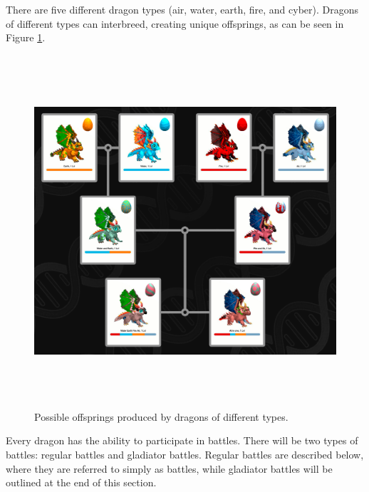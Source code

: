 \documentclass[12pt]{article}
\begin{document}
There are five different dragon types (air, water, earth, fire, and cyber). Dragons of different types can interbreed, creating unique offsprings, as can be seen in Figure \ref{fig:Possible_offsprings_produced_by_dragons_of_different_types_interbreeding}.\par



\begin{Center}
\begin{figure}[!ht]
	\begin{Center}		\includegraphics[width=6.27in,height=5.15in]{./media/image16.png}
		\caption{Possible offsprings produced by dragons of different types.}
		\label{fig:Possible_offsprings_produced_by_dragons_of_different_types_interbreeding}
	\end{Center}\end{figure}
\end{Center}





Every dragon has the ability to participate in battles. There will be two types of battles: regular battles and gladiator battles. Regular battles are described below, where they are referred to simply as battles, while gladiator battles will be outlined at the end of this section.\par
\end{document}
